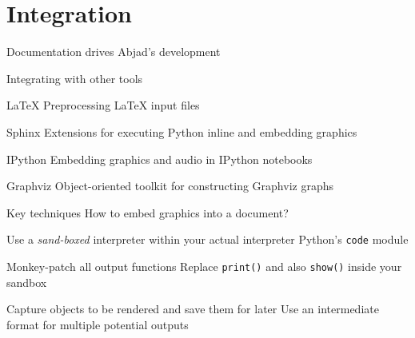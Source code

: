 \section{Integration}

\begin{frame}
Documentation drives Abjad's development
\end{frame}

\begin{frame}[fragile]{Integrating with other tools}
    \begin{block}{LaTeX}
        Preprocessing LaTeX input files
    \end{block}
    \begin{block}{Sphinx}
        Extensions for executing Python inline and embedding graphics
    \end{block}
    \begin{block}{IPython}
        Embedding graphics and audio in IPython notebooks
    \end{block}
    \begin{block}{Graphviz}
        Object-oriented toolkit for constructing Graphviz graphs
    \end{block}
\end{frame}

\begin{frame}[fragile]{Key techniques}
How to embed graphics into a document?

\begin{block}{Use a \emph{sand-boxed} interpreter within your actual interpreter}
Python's \texttt{code} module
\end{block}

\begin{block}{Monkey-patch all output functions}
Replace \texttt{print()} and also \texttt{show()} inside your sandbox
\end{block}

\begin{block}{Capture objects to be rendered and save them for later}
Use an intermediate format for multiple potential outputs
\end{block}
\end{frame}